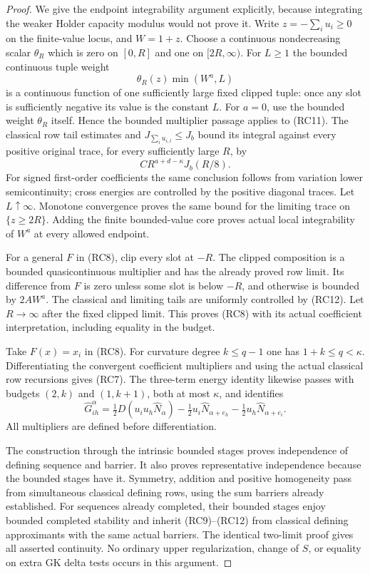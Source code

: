 \documentclass[11pt,a4paper]{article}
\numberwithin{equation}{section}
\theoremstyle{definition}
\theoremstyle{remark}
\begin{document}
\begin{proof}
We give the endpoint integrability argument explicitly,
because integrating the weaker Holder capacity modulus
would not prove it. Write $z=-\sum_i u_i\geq0$ on the
finite-value locus, and $W=1+z$. Choose a continuous
nondecreasing scalar $\theta_R$ which is zero on $[0,R]$
and one on $[2R,\infty)$. For $L\geq1$ the bounded
continuous tuple weight
\[
             \theta_R(z)\min(W^a,L)
 \tag{RC11}
\]
is a continuous function of one sufficiently large fixed
clipped tuple: once any slot is sufficiently negative its
value is the constant $L$. For $a=0$, use the bounded
weight $\theta_R$ itself. Hence the bounded multiplier
passage applies to (RC11). The classical row tail estimates
and $J_{\sum_i u_{i,l}}\leq J_b$ bound its integral against
every positive original trace, for every sufficiently large $R$, by
\[
                C R^{a+d-\kappa}J_b(R/8).
 \tag{RC12}
\]
For signed first-order coefficients the same conclusion
follows from variation lower semicontinuity; cross energies
are controlled by the positive diagonal traces.
Let $L\uparrow\infty$. Monotone convergence proves the
same bound for the limiting trace on $\{z\geq2R\}$.
Adding the finite bounded-value core proves actual local
integrability of $W^a$ at every allowed endpoint.

For a general $F$ in (RC8), clip every slot at $-R$.
The clipped composition is a bounded quasicontinuous
multiplier and has the already proved row limit.
Its difference from $F$ is zero unless some slot is below
$-R$, and otherwise is bounded by $2A W^a$.
The classical and limiting tails are uniformly controlled
by (RC12). Let $R\to\infty$ after the fixed clipped
limit. This proves (RC8) with its actual coefficient
interpretation, including equality in the budget.

Take $F(x)=x_i$ in (RC8). For curvature degree $k\leq q-1$
one has $1+k\leq q<\kappa$. Differentiating the convergent
coefficient multipliers and using the actual classical row
recursions gives (RC7). The three-term energy identity likewise
passes with budgets $(2,k)$ and $(1,k+1)$, both at most
$\kappa$, and identifies
\[
 \widehat G^\alpha_{ih}
   =\tfrac12D(u_i u_h\widehat N_\alpha)
     -\tfrac12u_i\widehat N_{\alpha+e_h}
     -\tfrac12u_h\widehat N_{\alpha+e_i}.
 \tag{RC13}
\]
All multipliers are defined before differentiation.

The construction through the intrinsic bounded stages proves
independence of defining sequence and barrier. It also proves
representative independence because the bounded stages have it.
Symmetry, addition and positive homogeneity pass from simultaneous
classical defining rows, using the sum barriers already established.
For sequences already completed, their bounded stages enjoy
bounded completed stability and inherit (RC9)--(RC12) from
classical defining approximants with the same actual barriers.
The identical two-limit proof gives all asserted continuity.
No ordinary upper regularization, change of $S$, or equality
on extra GK delta tests occurs in this argument.
\end{proof}
\end{document}
